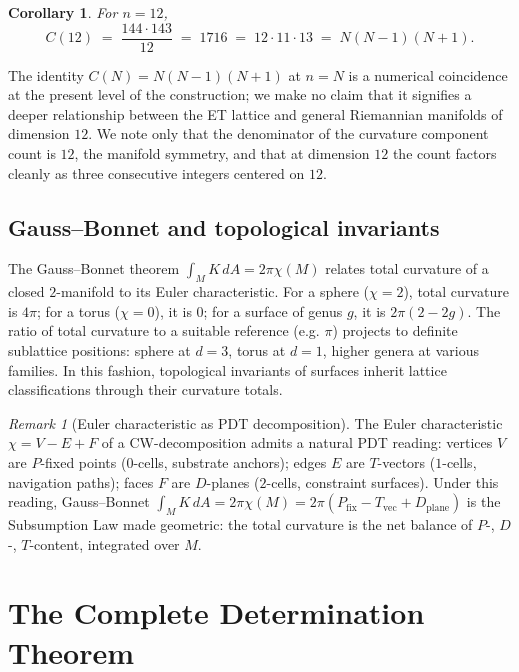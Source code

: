 \documentclass[11pt,a4paper]{article}
\newtheorem{corollary}[theorem]{Corollary}
\theoremstyle{definition}
\theoremstyle{remark}
\newtheorem{remark}[theorem]{Remark}
\begin{document}
\begin{corollary}\label{cor:1716}
For $n=12$,
\[
C(12) \;=\; \frac{144\cdot 143}{12} \;=\; 1716 \;=\; 12\cdot 11\cdot 13 \;=\; N(N-1)(N+1).
\]
\end{corollary}

The identity $C(N) = N(N-1)(N+1)$ at $n=N$ is a numerical coincidence at the present level of the construction; we make no claim that it signifies a deeper relationship between the ET lattice and general Riemannian manifolds of dimension $12$. We note only that the denominator of the curvature component count is $12$, the manifold symmetry, and that at dimension $12$ the count factors cleanly as three consecutive integers centered on $12$.

\subsection{Gauss--Bonnet and topological invariants}

The Gauss--Bonnet theorem $\int_{M}K\,dA = 2\pi\chi(M)$ relates total curvature of a closed $2$-manifold to its Euler characteristic. For a sphere ($\chi=2$), total curvature is $4\pi$; for a torus ($\chi=0$), it is $0$; for a surface of genus $g$, it is $2\pi(2-2g)$. The ratio of total curvature to a suitable reference (e.g. $\pi$) projects to definite sublattice positions: sphere at $d=3$, torus at $d=1$, higher genera at various families. In this fashion, topological invariants of surfaces inherit lattice classifications through their curvature totals.

\begin{remark}[Euler characteristic as PDT decomposition]
The Euler characteristic $\chi = V - E + F$ of a CW-decomposition admits a natural PDT reading: vertices $V$ are $P$-fixed points ($0$-cells, substrate anchors); edges $E$ are $T$-vectors ($1$-cells, navigation paths); faces $F$ are $D$-planes ($2$-cells, constraint surfaces). Under this reading, Gauss--Bonnet $\int_{M} K\,dA = 2\pi\chi(M) = 2\pi(P_{\text{fix}} - T_{\text{vec}} + D_{\text{plane}})$ is the Subsumption Law made geometric: the total curvature is the net balance of $P$-, $D$-, $T$-content, integrated over $M$.
\end{remark}

\section{The Complete Determination Theorem}\label{sec:secret26}
\end{document}
